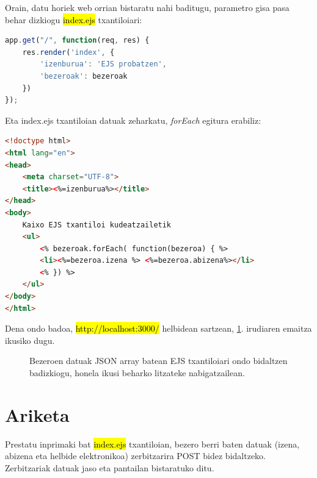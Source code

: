 Orain, datu horiek web orrian bistaratu nahi baditugu, parametro gisa pasa behar dizkiogu \hl{index.ejs} txantiloiari:

\begin{lstlisting}[language=JavaScript]
app.get("/", function(req, res) {
    res.render('index', {
        'izenburua': 'EJS probatzen',
        'bezeroak': bezeroak
    })
});
\end{lstlisting}

Eta index.ejs txantiloian datuak zeharkatu, \textit{forEach} egitura erabiliz:

\begin{lstlisting}[language=HTML]
<!doctype html>
<html lang="en">
<head>
    <meta charset="UTF-8">
    <title><%=izenburua%></title>
</head>
<body>
    Kaixo EJS txantiloi kudeatzailetik
    <ul>
        <% bezeroak.forEach( function(bezeroa) { %>
        <li><%=bezeroa.izena %> <%=bezeroa.abizena%></li>
        <% }) %>
    </ul>
</body>
</html>
\end{lstlisting}

Dena ondo badoa, \hl{http://localhost:3000/} helbidean sartzean, \ref{fig:txantiloia-ejs}. irudiaren emaitza ikusiko dugu.

\begin{figure}[ht]
	\centering
{}
\caption{Bezeroen datuak JSON array batean EJS txantiloiari ondo bidaltzen badizkiogu, honela ikusi beharko litzateke nabigatzailean.}
\label{fig:txantiloia-ejs}
\end{figure}

\section{Ariketa}
Prestatu inprimaki bat \hl{index.ejs} txantiloian, bezero berri baten datuak (izena, abizena eta helbide elektronikoa) zerbitzarira POST bidez bidaltzeko. Zerbitzariak datuak jaso eta pantailan bistaratuko ditu. 

